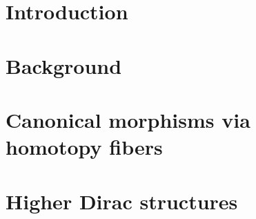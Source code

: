 \documentclass[handout,10pt]{beamer}
\begin{document}
\section{Introduction}
	


\section{Background}
	\checkpoint	
	

\section{Canonical morphisms via homotopy fibers}
	\checkpoint	
	

\section{Higher Dirac structures}
	\checkpoint
	
\end{document}
